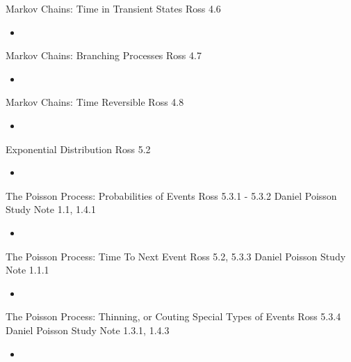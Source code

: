 \documentclass[12pt, titlepage, french]{report}
\begin{document}
\begin{CHPT_SUMM_AUTO_NUMB}[label = {L.-7}]{Markov Chains: Time in Transient States}
Ross 4.6
	\begin{itemize}
		\item	
	\end{itemize}
\end{CHPT_SUMM_AUTO_NUMB}

\begin{CHPT_SUMM_AUTO_NUMB}[label = {L.-8}]{Markov Chains: Branching Processes}
Ross 4.7
	\begin{itemize}
		\item	
	\end{itemize}
\end{CHPT_SUMM_AUTO_NUMB}

\begin{CHPT_SUMM_AUTO_NUMB}[label = {L.-9}]{Markov Chains: Time Reversible}
Ross 4.8
	\begin{itemize}
		\item	
	\end{itemize}
\end{CHPT_SUMM_AUTO_NUMB}

\begin{CHPT_SUMM_AUTO_NUMB}[label = {L.-10}]{Exponential Distribution}
Ross 5.2
	\begin{itemize}
		\item	
	\end{itemize}
\end{CHPT_SUMM_AUTO_NUMB}

\begin{CHPT_SUMM_AUTO_NUMB}[label = {L.-11}]{The Poisson Process: Probabilities of Events}
Ross 5.3.1 - 5.3.2
Daniel Poisson Study Note 1.1, 1.4.1
	\begin{itemize}
		\item	
	\end{itemize}
\end{CHPT_SUMM_AUTO_NUMB}

\begin{CHPT_SUMM_AUTO_NUMB}[label = {L.-12}]{The Poisson Process: Time To Next Event}
Ross 5.2, 5.3.3
Daniel Poisson Study Note 1.1.1
	\begin{itemize}
		\item	
	\end{itemize}
\end{CHPT_SUMM_AUTO_NUMB}

\begin{CHPT_SUMM_AUTO_NUMB}[label = {L.-13}]{{The Poisson Process: Thinning, or Couting Special Types of Events}}
Ross 5.3.4
Daniel Poisson Study Note 1.3.1, 1.4.3
	\begin{itemize}
		\item	
	\end{itemize}
\end{CHPT_SUMM_AUTO_NUMB}
\end{document}
